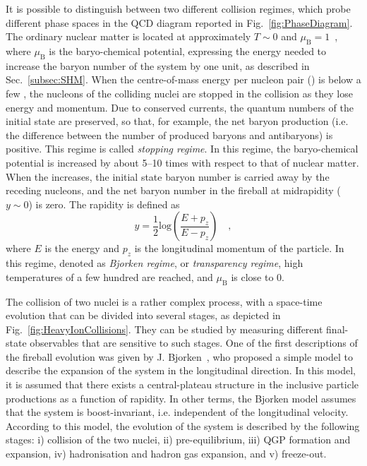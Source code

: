 It is possible to distinguish between two different collision regimes, which probe different phase spaces in the QCD diagram reported in Fig.~\ref{fig:PhaseDiagram}. The ordinary nuclear matter is located at approximately $T\sim0$ and $\mu_\mathrm{B}=1$~\gev, where $\mu_\mathrm{B}$ is the baryo-chemical potential, expressing the energy needed to increase the baryon number of the system by one unit, as described in Sec.~\ref{subsec:SHM}. When the centre-of-mass energy per nucleon pair (\snn) is below a few \gev, the nucleons of the colliding nuclei are stopped in the collision as they lose energy and momentum. Due to conserved currents, the quantum numbers of the initial state are preserved, so that, for example, the net baryon production (i.e. the difference between the number of produced baryons and antibaryons) is positive. This regime is called \emph{stopping regime}. In this regime, the baryo-chemical potential is increased by about 5--10 times with respect to that of nuclear matter. When the \snn increases, the initial state baryon number is carried away by the receding nucleons, and the net baryon number in the fireball at midrapidity ($y\sim0$) is zero. The rapidity is defined as 
\begin{equation*}
    y = \frac{1}{2}\mathrm{log}\left(\frac{E+p_z}{E-p_z}\right)\quad ,
\end{equation*}
where $E$ is the energy and $p_z$ is the longitudinal momentum of the particle. In this regime, denoted as \emph{Bjorken regime}, or \emph{transparency regime}, high temperatures of a few hundred \mev are reached, and $\mu_\mathrm{B}$ is close to 0.   

The collision of two nuclei is a rather complex process, with a space-time evolution that can be divided into several stages, as depicted in Fig.~\ref{fig:HeavyIonCollisions}. They can be studied by measuring different final-state observables that are sensitive to such stages. One of the first descriptions of the fireball evolution was given by J. Bjorken~\cite{Bjorken:1982qr}, who proposed a simple model to describe the expansion of the system in the longitudinal direction. In this model, it is assumed that there exists a central-plateau structure in the inclusive particle productions as a function of rapidity. In other terms, the Bjorken model assumes that the system is boost-invariant, i.e. independent of the longitudinal velocity. According to this model, the evolution of the system is described by the following stages: i) collision of the two nuclei, ii) pre-equilibrium, iii) QGP formation and expansion, iv) hadronisation and hadron gas expansion, and v) freeze-out.

